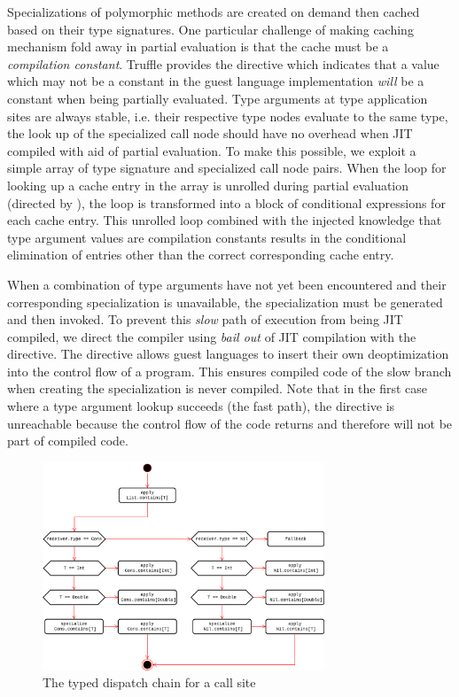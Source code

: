 Specializations of polymorphic methods are created on demand then cached based on their type signatures.
One particular challenge of making caching mechanism fold away in partial evaluation is that the cache must be a \textit{compilation constant}.
Truffle provides the  directive which indicates that a value which may not be a constant in the guest language implementation \textit{will} be a constant when being partially evaluated.
Type arguments at type application sites are always stable, i.e. their respective type nodes evaluate to the same type, the look up of the specialized call node should have no overhead when JIT compiled with aid of partial evaluation. 
To make this possible, we exploit a simple array of type signature and specialized call node pairs.
When the loop for looking up a cache entry in the array is unrolled during partial evaluation (directed by ), the loop is transformed into a block of conditional expressions for each cache entry.
This unrolled loop combined with the injected knowledge that type argument values are compilation constants results in the conditional elimination\cite{conditional-elim} of entries other than the correct corresponding cache entry.

When a combination of type arguments have not yet been encountered and their corresponding specialization is unavailable, the specialization must be generated and then invoked.
To prevent this \textit{slow} path of execution from being JIT compiled, we direct the compiler using \textit{bail out} of JIT compilation with the  directive.
The directive allows guest languages to insert their own deoptimization into the control flow of a program.
This ensures compiled code of the slow branch when creating the specialization is never compiled.
Note that in the first case where a type argument lookup succeeds (the fast path), the directive is unreachable because the control flow of the code returns and therefore will not be part of compiled code.

\begin{figure}[!htb]
	\centering
	\includegraphics[width=0.75\textwidth]{figures/tastytruffle-type-dispatch-chain.png}
	\caption{The typed dispatch chain for a  call site}
	\label{example:typed-dispatch}
\end{figure}


